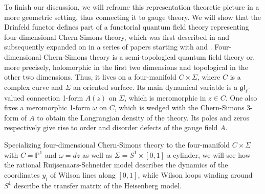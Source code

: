 \documentclass[11pt]{report}
\theoremstyle{definition}
\theoremstyle{remark}
\theoremstyle{remark}
\renewcommand{\P}{\mathbb{P}}
\begin{document}
To finish our discussion, we will reframe this representation theoretic picture in a more geometric setting, thus connecting it to gauge theory. We will show that the Drinfeld functor defines part of a functorial quantum field theory representing four-dimensional Chern-Simons theory, which was first described in \cite{article:costello:2013} and subsequently expanded on in a series of papers starting with \cite{article:costello:2018} and \cite{article:costello:2018b}. Four-dimensional Chern-Simons theory is a semi-topological quantum field theory or, more precisely, holomorphic in the first two dimensions and topological in the other two dimensions. Thus, it lives on a four-manifold $C \times \Sigma$, where $C$ is a complex curve and $\Sigma$ an oriented surface. Its main dynamical variable is a $\mathfrak{gl}_\ell$-valued connection 1-form $A(z)$ on $\Sigma$, which is meromorphic in $z \in C$. One also fixes a meromorphic 1-form $\omega$ on $C$, which is wedged with the Chern-Simons 3-form of $A$ to obtain the Langrangian density of the theory. Its poles and zeros respectively give rise to order and disorder defects of the gauge field $A$.

Specializing four-dimensional Chern-Simons theory to the four-manifold $C \times \Sigma$ with $C = \P^1$ and $\omega = dz$ as well as $\Sigma = S^1 \times [0,1]$ a cylinder, we will see how the rational Ruijsenaars-Schneider model describes the dynamics of the coordinates $y_i$ of Wilson lines along $[0,1]$, while Wilson loops winding around $S^1$ describe the transfer matrix of the Heisenberg model.
\end{document}
